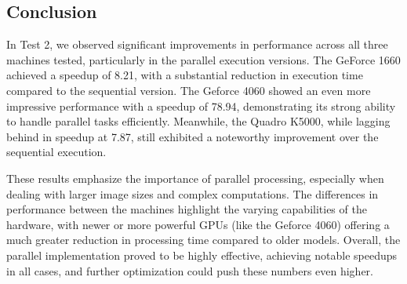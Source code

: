 \subsection{Conclusion}
In Test 2, we observed significant improvements in performance across all three machines tested, particularly in the parallel execution versions. The GeForce 1660 achieved a speedup of 8.21, with a substantial reduction in execution time compared to the sequential version. The Geforce 4060 showed an even more impressive performance with a speedup of 78.94, demonstrating its strong ability to handle parallel tasks efficiently. Meanwhile, the Quadro K5000, while lagging behind in speedup at 7.87, still exhibited a noteworthy improvement over the sequential execution.

These results emphasize the importance of parallel processing, especially when dealing with larger image sizes and complex computations. The differences in performance between the machines highlight the varying capabilities of the hardware, with newer or more powerful GPUs (like the Geforce 4060) offering a much greater reduction in processing time compared to older models. Overall, the parallel implementation proved to be highly effective, achieving notable speedups in all cases, and further optimization could push these numbers even higher.

